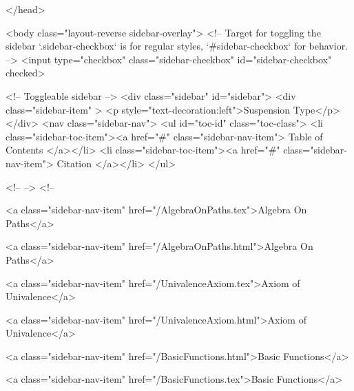   
</head>




  <body class="layout-reverse sidebar-overlay">
    <!-- Target for toggling the sidebar `.sidebar-checkbox` is for regular
     styles, `#sidebar-checkbox` for behavior. -->
<input type="checkbox" class="sidebar-checkbox" id="sidebar-checkbox" checked>

<!-- Toggleable sidebar -->
<div class="sidebar" id="sidebar">
  <div class="sidebar-item" >
    <p style="text-decoration:left">Suspension Type</p>
  </div>
  <nav class="sidebar-nav">
    <ul id="toc-id" class="toc-class">
  <li class="sidebar-toc-item"><a href="#" class="sidebar-nav-item"> Table of Contents </a></li>
  <li class="sidebar-toc-item"><a href="#" class="sidebar-nav-item"> Citation </a></li>
</ul>


    <!--  -->
    <!-- 
      
    
      
    
      
    
      
        
      
    
      
        
          <a class="sidebar-nav-item" href="/AlgebraOnPaths.tex">Algebra On Paths</a>
        
      
    
      
        
          <a class="sidebar-nav-item" href="/AlgebraOnPaths.html">Algebra On Paths</a>
        
      
    
      
        
          <a class="sidebar-nav-item" href="/UnivalenceAxiom.tex">Axiom of Univalence</a>
        
      
    
      
        
          <a class="sidebar-nav-item" href="/UnivalenceAxiom.html">Axiom of Univalence</a>
        
      
    
      
        
          <a class="sidebar-nav-item" href="/BasicFunctions.html">Basic Functions</a>
        
      
    
      
        
          <a class="sidebar-nav-item" href="/BasicFunctions.tex">Basic Functions</a>
        
      
    
